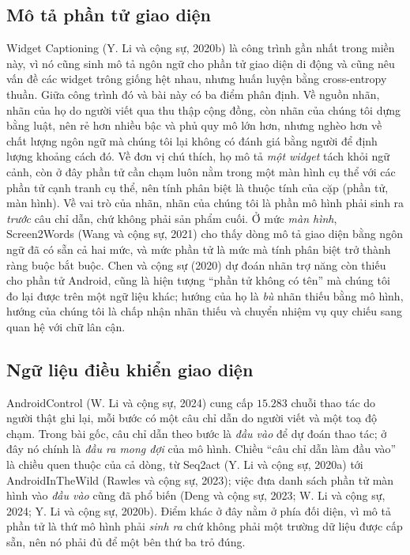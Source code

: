 \documentclass[12pt,a4paper,onecolumn]{article}
\newcommand{\ôvuông}[2]{\tikz[baseline=-0.45ex]{\draw[#1,line width=0.9pt,#2] (0,0) rectangle (0.34,0.18);}}
\begin{document}
\subsection{Mô tả phần tử giao diện}
Widget Captioning (Y. Li và cộng sự, 2020b) là công trình gần nhất trong miền này, vì nó cũng sinh mô tả ngôn ngữ cho phần tử giao
diện di động và cũng nêu vấn đề các widget trông giống hệt nhau, nhưng huấn luyện bằng
cross-entropy thuần. Giữa công trình đó và bài này có ba điểm phân định. Về nguồn nhãn, nhãn của họ
do người viết qua thu thập cộng đồng, còn nhãn của chúng tôi dựng bằng luật, nên rẻ hơn nhiều bậc và phủ quy mô lớn hơn, nhưng nghèo hơn về chất lượng ngôn ngữ mà chúng tôi lại
không có đánh giá bằng người để định lượng khoảng cách đó. Về đơn vị chú thích, họ mô tả
\emph{một widget} tách khỏi ngữ cảnh, còn ở đây phần tử cần chạm luôn nằm trong một màn hình
cụ thể với các phần tử cạnh tranh cụ thể, nên tính phân biệt là thuộc tính của cặp (phần
tử, màn hình). Về vai trò của nhãn, nhãn của chúng tôi là phần mô hình phải sinh ra
\emph{trước} câu chỉ dẫn, chứ không phải sản phẩm cuối. Ở
mức \emph{màn hình}, Screen2Words (Wang và cộng sự, 2021) cho thấy dòng mô tả giao diện
bằng ngôn ngữ đã có sẵn cả hai mức, và mức phần tử là mức mà tính phân biệt trở thành ràng
buộc bắt buộc. Chen và cộng sự (2020) dự đoán nhãn trợ năng còn thiếu cho phần tử Android, cũng là hiện tượng ``phần tử không có tên'' mà chúng tôi đo lại được trên một ngữ liệu
khác; hướng của họ là \emph{bù} nhãn thiếu bằng mô hình, hướng của chúng tôi là chấp nhận
nhãn thiếu và chuyển nhiệm vụ quy chiếu sang quan hệ với chữ lân cận.

\subsection{Ngữ liệu điều khiển giao diện}
AndroidControl (W. Li và cộng sự, 2024) cung cấp $15.283$ chuỗi thao tác do người thật ghi
lại, mỗi bước có một câu chỉ dẫn do người viết và một toạ độ chạm. Trong bài gốc, câu chỉ
dẫn theo bước là \emph{đầu vào} để dự đoán thao tác; ở đây nó chính là \emph{đầu ra mong
đợi} của mô hình. Chiều ``câu chỉ dẫn làm đầu vào'' là chiều quen thuộc của cả dòng, từ
Seq2act (Y. Li và cộng sự, 2020a) tới AndroidInTheWild (Rawles và cộng sự, 2023); việc đưa
danh sách phần tử màn hình vào \emph{đầu vào} cũng đã phổ biến (Deng và cộng sự, 2023;
W. Li và cộng sự, 2024; Y. Li và cộng sự, 2020b). Điểm khác ở đây nằm ở phía đối diện, vì mô tả phần tử là thứ mô hình phải \emph{sinh ra}
chứ không phải một trường dữ liệu được cấp sẵn, nên nó phải đủ để một bên thứ ba trỏ
đúng.
\end{document}
